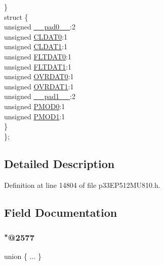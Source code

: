 \begin{DoxyCompactItemize}
\begin{tabbing}
\>\} \\
\>struct \{\\
\>\>unsigned \hyperlink{structtag_i_o_c_o_n4_b_i_t_s_adf71f3d8410c1f1dbbc96680a92c49af}{\_\_pad0\_\_}:2\\
\>\>unsigned \hyperlink{structtag_i_o_c_o_n4_b_i_t_s_a524fe5d7c4f19a9e5bab6fdae8cb6113}{CLDAT0}:1\\
\>\>unsigned \hyperlink{structtag_i_o_c_o_n4_b_i_t_s_abd730465de1cbb6fd169fef4c9f97b9e}{CLDAT1}:1\\
\>\>unsigned \hyperlink{structtag_i_o_c_o_n4_b_i_t_s_a154c32b551ecc420f476def330e87abd}{FLTDAT0}:1\\
\>\>unsigned \hyperlink{structtag_i_o_c_o_n4_b_i_t_s_a76d169f1247080fb508c7b31f62e89ab}{FLTDAT1}:1\\
\>\>unsigned \hyperlink{structtag_i_o_c_o_n4_b_i_t_s_a45d53d0768dd2659f98447ad77cc91b1}{OVRDAT0}:1\\
\>\>unsigned \hyperlink{structtag_i_o_c_o_n4_b_i_t_s_a095c02d71ec41de4ed9985a86207253f}{OVRDAT1}:1\\
\>\>unsigned \hyperlink{structtag_i_o_c_o_n4_b_i_t_s_acaf2d0924a107ec6e8d2e31febaf66f9}{\_\_pad1\_\_}:2\\
\>\>unsigned \hyperlink{structtag_i_o_c_o_n4_b_i_t_s_ac125b1e88bd44f7f044dcb0185cfb781}{PMOD0}:1\\
\>\>unsigned \hyperlink{structtag_i_o_c_o_n4_b_i_t_s_a961c1af920bb390a3b4ff925e45fa059}{PMOD1}:1\\
\>\} \\
\}; \\

\end{tabbing}\end{DoxyCompactItemize}


\subsection{Detailed Description}


Definition at line 14804 of file p33\+E\+P512\+M\+U810.\+h.



\subsection{Field Documentation}
\mbox{\label{structtag_i_o_c_o_n4_b_i_t_s_aa6c8f9ee567682ca37f429af3f19acdf}} 
\subsubsection{\texorpdfstring{"@2577}{@2577}}
{\footnotesize\ttfamily union \{ ... \} }

